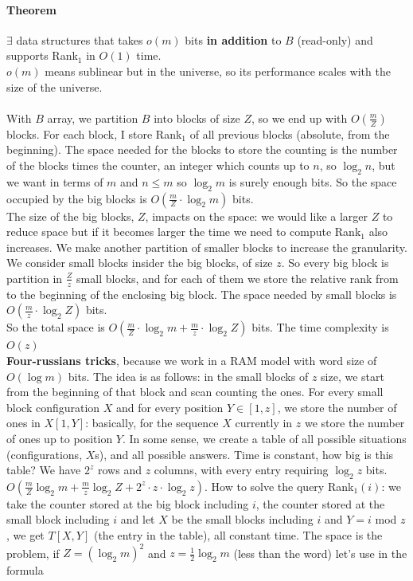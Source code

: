 \documentclass[10pt]{report}
\begin{document}
\paragraph{Theorem} $\exists$ data structures that takes $o(m)$ bits \textbf{in addition} to $B$ (read-only) and supports Rank$_1$ in $O(1)$ time.\\
$o(m)$ means sublinear but in the universe, so its performance scales with the size of the universe.\\\\
With $B$ array, we partition $B$ into blocks of size $Z$, so we end up with $O\left(\frac{m}{Z}\right)$ blocks. For each block, I store Rank$_1$ of all previous blocks (absolute, from the beginning). The space needed for the blocks to store the counting is the number of the blocks times the counter, an integer which counts up to $n$, so $\log_2 n$, but we want in terms of $m$ and $n\leq m$ so $\log_2 m$ is surely enough bits. So the space occupied by the big blocks is $O\left(\frac{m}{Z}\cdot \log_2 m\right)$ bits.\\
The size of the big blocks, $Z$, impacts on the space: we would like a larger $Z$ to reduce space but if it becomes larger the time we need to compute Rank$_1$ also increases. We make another partition of smaller blocks to increase the granularity. We consider small blocks insider the big blocks, of size $z$. So every big block is partition in $\frac{Z}{z}$ small blocks, and for each of them we store the relative rank from to the beginning of the enclosing big block. The space needed by small blocks is $O\left(\frac{m}{z}\cdot\log_2 Z\right)$ bits.\\
So the total space is $O\left(\frac{m}{Z}\cdot\log_2 m + \frac{m}{z}\cdot\log_2 Z\right)$ bits. The time complexity is $O(z)$\\ %
\textbf{Four-russians tricks}, because we work in a RAM model with word size of $O(\log m)$ bits. The idea is as follows: in the small blocks of $z$ size, we start from the beginning of that block and scan counting the ones. For every small block configuration $X$ and for every position $Y\in[1,z]$, we store the number of ones in $X[1,Y]$: basically, for the sequence $X$ currently in $z$ we store the number of ones up to position $Y$. In some sense, we create a table of all possible situations (configurations, $X$s), and all possible answers. Time is constant, how big is this table? We have $2^z$ rows and $z$ columns, with every entry requiring $\log_2 z$ bits.\\
$O\left(\frac{m}{Z}\log_2 m + \frac{m}{z}\log_2 Z + 2^z\cdot z\cdot\log_2 z\right)$. How to solve the query Rank$_1(i)$: we take the counter stored at the big block including $i$, the counter stored at the small block including $i$ and let $X$ be the small blocks including $i$ and $Y=i$ mod $z$, we get $T[X,Y]$ (the entry in the table), all constant time. The space is the problem, if $Z=(\log_2 m)^2$ and $z = \frac{1}{2}\log_2 m$ (less than the word) let's use in the formula
\end{document}
